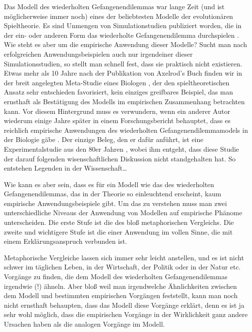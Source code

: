 Das Modell des wiederholten Gefangenendilemmas war lange Zeit (und ist
möglicherweise immer noch) eines der beliebtesten Modelle der evolutionären
Spieltheorie. Es sind Unmengen von Simulationstudien publiziert worden, die 
in der ein- oder anderen Form das wiederholte Gefangenendilemma 
durchspielen \cite[]{hoffmann:2000}. Wie steht es aber um die empirische
Anwendung dieser Modelle? Sucht man nach erfolgreichen Anwendungsbeispielen
auch nur irgendeiner dieser Simulationsstudien, so stellt man schnell fest, dass
sie praktisch nicht existieren. Etwas mehr als 10 Jahre nach der Publikation von
Axelrod's Buch \cite[]{axelrod:1984} finden wir in der breit angelegten
Meta-Studie eines Biologen \cite[]{dugatkin:1997}, der den spieltheoretischen
Ansatz sehr entschieden favorisiert, kein einziges greifbares Beispiel, 
das man ernsthaft als Bestätigung des Modells im empirischen Zusammenhang
betrachten kann. Vor diesem Hintergrund muss es verwundern, wenn ein anderer
Autor wiederum einige Jahre später in einem Forschungsbericht behauptet, dass
es reichlich empirische Anwendungen des wiederholten Gefangenendilemmamodels in
der Biologie gäbe \cite[]{hoffmann:2000}. Der einzige Beleg, den er dafür
anführt, ist eine Experimentalstudie aus den 80er Jahren \cite[]{milinski:1987}, wobei ihm
entgeht, dass diese Studie der darauf folgenden wisenschaftlichen Diskussion nicht 
standgehalten hat. So entstehen Legenden in der Wissenschaft\ldots 

Wie kann es aber sein, dass es für ein Modell wie das des wiederholten
Gefangenendilemmas, das in der Theorie so einleuchtend erscheint, kaum
empirische Anwendungsbeispiele gibt. Um das zu verstehen muss man
zwei unterschiedliche Niveaus der Anwendung von Modellen auf empirische
Phänome unterscheiden. Die erste Stufe ist die des bloß metaphorischen
Vergleichs. Die zweite und wichtigere Stufe ist die einer Anwendung im vollen
Sinne, die mit einem Erklärungsanspruch verbunden ist.

Metaphorische Vergleiche lassen sich immer sehr leicht anstellen, und es ist
nicht schwer im täglichen Leben, in der Wirtschaft, der Politik oder in der 
Natur etc. Vorgänge zu finden, die dem Modell des wiederholten
Gefangenendilemmas irgendwie (!) ähneln. 
Aber bloß weil man irgendwelche Ähnlichkeiten zwischen dem Modell und
bestimmten empirischen Vorgängen feststellt, kann man noch nicht ernsthaft
behaupten, dass das Modell diese Vorgänge erklärt, denn es ist ja sehr wohl
möglich, dass die empirischen Vorgänge in der Wirklichkeit ganz andere Ursachen
haben als die analogen Vorgänge im Modell.

